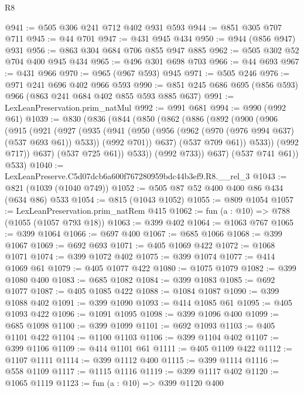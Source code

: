 \begin{lexlean}{R8}
\begin{coremodule}
@941 := @505 @306 @241 @712 @402 @931 @593
@944 := @851 @305 @707 @711
@945 := @44 @701
@947 := @431 @945 @434
@950 := @944 (@856 @947) @931
@956 := @863 @304 @684 @706 @855 @947 @885
@962 := @505 @302 @52 @704 @400 @945 @434
@965 := @496 @301 @698 @703
@966 := @44 @693
@967 := @431 @966
@970 := @965 (@967 @593) @945
@971 := @505 @246
@976 := @971 @241 @696 @402 @966 @593
@990 := @851 @245 @686 @695 (@856 @593) @966 (@863 @241 @684 @402 @855 @593 @885 @637)
@991 := LexLeanPreservation.prim_natMul
@992 := @991 @681
@994 := @990 (@992 @61)
@1039 := @830
    (@836
      (@844
        (@850
          (@862
            (@886
              (@892
                (@900
                  (@906
                    (@915
                      (@921
                        (@927
                          (@935
                            (@941
                              (@950
                                (@956 (@962 (@970 (@976 @994 @637) (@537 @693 @61)) @533))
                                (@992 @701))
                              @637)
                            (@537 @709 @61))
                          @533))
                      (@992 @717))
                    @637)
                  (@537 @725 @61))
                @533))
            (@992 @733))
          @637)
        (@537 @741 @61))
      @533)
@1040 := LexLeanPreserve.C5d07dcb6a600f767280959bdc44b3ef9.R8.__rel_3
@1043 := @821 (@1039 (@1040 @749))
@1052 := @505 @87 @52 @400 @400 @86 @434 (@634 @86) @533
@1054 := @815 (@1043 @1052)
@1055 := @809 @1054
@1057 := LexLeanPreservation.prim_natRem @415
@1062 := fun (a : @10) => @788 (@1055 (@1057 @793 @18))
@1063 := @399 @402
@1064 := @1063 @767
@1065 := @399 @1064
@1066 := @697 @400
@1067 := @685 @1066
@1068 := @399 @1067
@1069 := @692 @693
@1071 := @405 @1069 @422
@1072 := @1068 @1071
@1074 := @399 @1072 @402
@1075 := @399 @1074
@1077 := @414 @1069 @61
@1079 := @405 @1077 @422
@1080 := @1075 @1079
@1082 := @399 @1080 @400
@1083 := @685 @1082
@1084 := @399 @1083
@1085 := @692 @1077
@1087 := @405 @1085 @422
@1088 := @1084 @1087
@1090 := @399 @1088 @402
@1091 := @399 @1090
@1093 := @414 @1085 @61
@1095 := @405 @1093 @422
@1096 := @1091 @1095
@1098 := @399 @1096 @400
@1099 := @685 @1098
@1100 := @399 @1099
@1101 := @692 @1093
@1103 := @405 @1101 @422
@1104 := @1100 @1103
@1106 := @399 @1104 @402
@1107 := @399 @1106
@1109 := @414 @1101 @61
@1111 := @405 @1109 @422
@1112 := @1107 @1111
@1114 := @399 @1112 @400
@1115 := @399 @1114
@1116 := @558 @1109
@1117 := @1115 @1116
@1119 := @399 @1117 @402
@1120 := @1065 @1119
@1123 := fun (a : @10) => @399 @1120 @400

\end{coremodule}
\end{lexlean}
